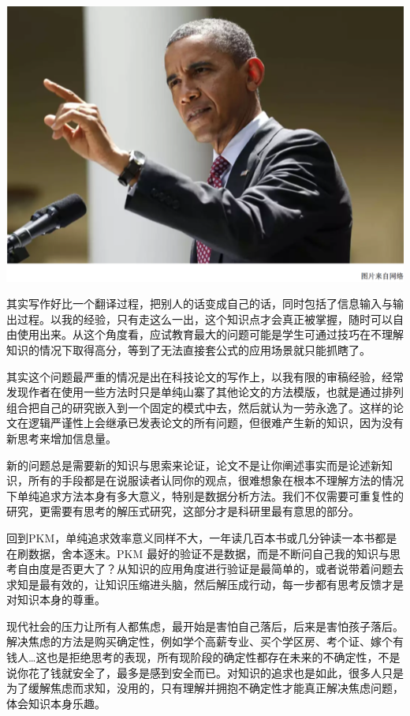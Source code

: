 \documentclass[
]{book}
\begin{document}
\includegraphics[width=8.33in]{images/gtd3}

其实写作好比一个翻译过程，把别人的话变成自己的话，同时包括了信息输入与输出过程。以我的经验，只有走这么一出，这个知识点才会真正被掌握，随时可以自由使用出来。从这个角度看，应试教育最大的问题可能是学生可通过技巧在不理解知识的情况下取得高分，等到了无法直接套公式的应用场景就只能抓瞎了。

其实这个问题最严重的情况是出在科技论文的写作上，以我有限的审稿经验，经常发现作者在使用一些方法时只是单纯山寨了其他论文的方法模版，也就是通过排列组合把自己的研究嵌入到一个固定的模式中去，然后就认为一劳永逸了。这样的论文在逻辑严谨性上会继承已发表论文的所有问题，但很难产生新的知识，因为没有新思考来增加信息量。

新的问题总是需要新的知识与思索来论证，论文不是让你阐述事实而是论述新知识，所有的手段都是在说服读者认同你的观点，很难想象在根本不理解方法的情况下单纯追求方法本身有多大意义，特别是数据分析方法。我们不仅需要可重复性的研究，更需要有思考的解压式研究，这部分才是科研里最有意思的部分。

回到PKM，单纯追求效率意义同样不大，一年读几百本书或几分钟读一本书都是在刷数据，舍本逐末。PKM 最好的验证不是数据，而是不断问自己我的知识与思考自由度是否更大了？从知识的应用角度进行验证是最简单的，或者说带着问题去求知是最有效的，让知识压缩进头脑，然后解压成行动，每一步都有思考反馈才是对知识本身的尊重。

现代社会的压力让所有人都焦虑，最开始是害怕自己落后，后来是害怕孩子落后。解决焦虑的方法是购买确定性，例如学个高薪专业、买个学区房、考个证、嫁个有钱人\ldots 这也是拒绝思考的表现，所有现阶段的确定性都存在未来的不确定性，不是说你花了钱就安全了，最多是感到安全而已。对知识的追求也是如此，很多人只是为了缓解焦虑而求知，没用的，只有理解并拥抱不确定性才能真正解决焦虑问题，体会知识本身乐趣。
\end{document}
